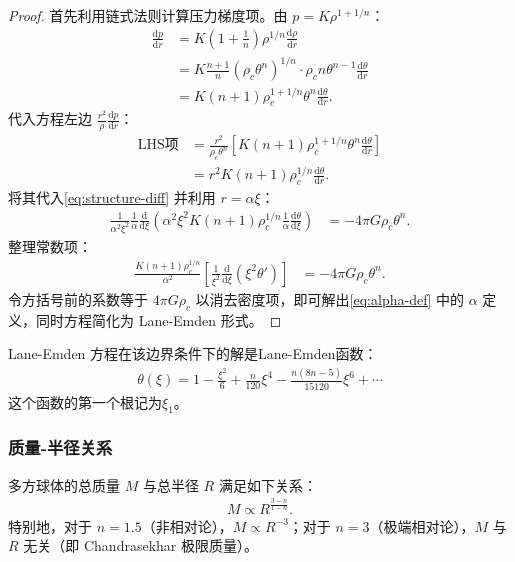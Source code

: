 \begin{proof}
    首先利用链式法则计算压力梯度项。由 $p = K \rho^{1+1/n}$：
    \begin{align}
    \frac{\mathrm{d}p}{\mathrm{d}r} 
    &= K(1+\frac{1}{n})\rho^{1/n}\frac{\mathrm{d}\rho}{\mathrm{d}r} \nonumber \\
    &= K\frac{n+1}{n}(\rho_c \theta^n)^{1/n} \cdot \rho_c n \theta^{n-1} \frac{\mathrm{d}\theta}{\mathrm{d}r} \nonumber \\
    &= K(n+1)\rho_c^{1+1/n} \theta^n \frac{\mathrm{d}\theta}{\mathrm{d}r}. \label{eq:dp-chain}
    \end{align}
    代入方程左边 $\frac{r^2}{\rho}\frac{\mathrm{d}p}{\mathrm{d}r}$：
    \begin{align}
    \text{LHS项} &= \frac{r^2}{\rho_c \theta^n} \left[ K(n+1)\rho_c^{1+1/n} \theta^n \frac{\mathrm{d}\theta}{\mathrm{d}r} \right] \nonumber \\
    &= r^2 K(n+1)\rho_c^{1/n} \frac{\mathrm{d}\theta}{\mathrm{d}r}.
    \end{align}
    将其代入\eqref{eq:structure-diff} 并利用 $r=\alpha\xi$：
    \begin{align}
    \frac{1}{\alpha^2 \xi^2} \frac{1}{\alpha}\frac{\mathrm{d}}{\mathrm{d}\xi} \left( \alpha^2 \xi^2 K(n+1)\rho_c^{1/n} \frac{1}{\alpha}\frac{\mathrm{d}\theta}{\mathrm{d}\xi} \right) &= -4\pi G \rho_c \theta^n.
    \end{align}
    整理常数项：
    \begin{align}
    \frac{K(n+1)\rho_c^{1/n}}{\alpha^2} \left[ \frac{1}{\xi^2}\frac{\mathrm{d}}{\mathrm{d}\xi}\left(\xi^2 \theta' \right) \right] &= -4\pi G \rho_c \theta^n.
    \end{align}
    令方括号前的系数等于 $4\pi G \rho_c$ 以消去密度项，即可解出\eqref{eq:alpha-def} 中的 $\alpha$ 定义，同时方程简化为 Lane-Emden 形式。
\end{proof}

Lane-Emden 方程在该边界条件下的解是Lane-Emden函数：
\begin{align}
\theta(\xi) = 1 - \frac{\xi^2}{6} + \frac{n}{120}\xi^4 - \frac{n(8n-5)}{15120}\xi^6 + \cdots \label{eq:lane-emden-solution}
\end{align}
这个函数的第一个根记为$\xi_1$。
\subsubsection{质量-半径关系}

\begin{theorem}[质量-半径关系]
    多方球体的总质量 $M$ 与总半径 $R$ 满足如下关系：
    \begin{align}
    M \propto R^{\frac{3-n}{1-n}}. \label{eq:MR-scaling}
    \end{align}
    特别地，对于 $n=1.5$（非相对论），$M \propto R^{-3}$；对于 $n=3$（极端相对论），$M$ 与 $R$ 无关（即 Chandrasekhar 极限质量）。
\end{theorem}

